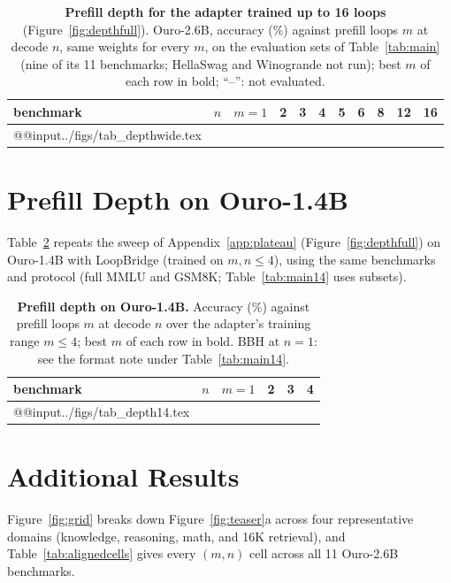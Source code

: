 \documentclass[11pt]{article}
\begin{document}
\begin{table}[t]
\centering\small
\begin{tabular}{@{}lrrrrrrrrrr@{}}
\toprule
benchmark & $n$ & $m{=}1$ & 2 & 3 & 4 & 5 & 6 & 8 & 12 & 16 \\
\midrule
\csname @@input\endcsname ../figs/tab_depthwide.tex
\bottomrule
\end{tabular}
\caption{\textbf{Prefill depth for the adapter trained up to 16 loops} (Figure~\ref{fig:depthfull}). Ouro-2.6B, accuracy (\%)
against prefill loops $m$ at decode $n$, same weights for every $m$, on the evaluation sets of Table~\ref{tab:main}
(nine of its 11 benchmarks; HellaSwag and Winogrande not run); best $m$ of each row in bold; ``--'': not evaluated.}
\label{tab:depthwide}
\end{table}

\section{Prefill Depth on Ouro-1.4B}
\label{app:depth14}

Table~\ref{tab:depth14} repeats the sweep of Appendix~\ref{app:plateau} (Figure~\ref{fig:depthfull}) on Ouro-1.4B with LoopBridge (trained on
$m,n\le4$), using the same benchmarks and protocol (full MMLU and GSM8K; Table~\ref{tab:main14} uses subsets).

\begin{table}[t]
\centering\small
\begin{tabular}{@{}lrrrrr@{}}
\toprule
benchmark & $n$ & $m{=}1$ & 2 & 3 & 4 \\
\midrule
\csname @@input\endcsname ../figs/tab_depth14.tex
\bottomrule
\end{tabular}
\caption{\textbf{Prefill depth on Ouro-1.4B.} Accuracy (\%) against prefill loops $m$ at decode $n$ over the adapter's
training range $m\le4$; best $m$ of each row in bold. BBH at $n=1$: see the format note under Table~\ref{tab:main14}.}
\label{tab:depth14}
\end{table}

\section{Additional Results}
\label{app:extended}

Figure~\ref{fig:grid} breaks down Figure~\ref{fig:teaser}a across four representative domains (knowledge, reasoning,
math, and 16K retrieval), and Table~\ref{tab:alignedcells} gives every $(m,n)$ cell across all 11 Ouro-2.6B benchmarks.
\end{document}
